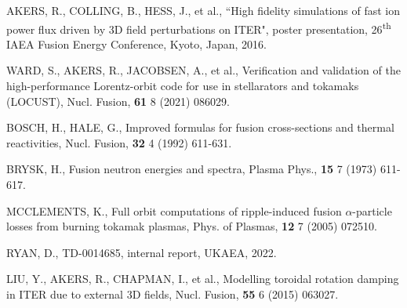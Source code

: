 \documentclass[10pt, a4paper, twoside]{article}
\begin{document}
\begin{thebibliography}{9}
    AKERS, R., COLLING, B., HESS, J., et al.,
    ``High fidelity simulations of fast ion power flux driven by 3D field perturbations on ITER",
    poster presentation, 
    26\textsuperscript{th} IAEA Fusion Energy Conference,
    Kyoto, Japan, 
    2016.

    WARD, S., AKERS, R., JACOBSEN, A., et al.,
    Verification and validation of the high-performance Lorentz-orbit code for use in stellarators and tokamaks (LOCUST),
    Nucl. Fusion,
    \textbf{61} 8
    (2021)
    086029.

    BOSCH, H., HALE, G.,
    Improved formulas for fusion cross-sections and thermal reactivities,
    Nucl. Fusion,
    \textbf{32} 4
    (1992)
    611-631.

    BRYSK, H.,
    Fusion neutron energies and spectra,
    Plasma Phys.,
    \textbf{15} 7
    (1973)
    611-617.

    MCCLEMENTS, K.,
    Full orbit computations of ripple-induced fusion $\alpha$-particle losses from burning tokamak plasmas,
    Phys. of Plasmas,
    \textbf{12} 7
    (2005)
    072510.

    RYAN, D., 
    TD-0014685, 
    internal report, 
    UKAEA, 
    2022.

    LIU, Y., AKERS, R., CHAPMAN, I., et al.,
    Modelling toroidal rotation damping in ITER due to external 3D fields,
    Nucl. Fusion,
    \textbf{55} 6
    (2015)
    063027.


\end{thebibliography}
\end{document}
